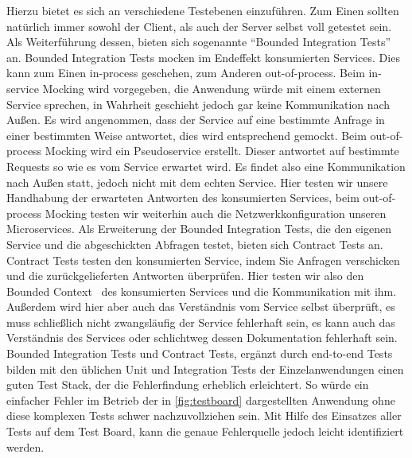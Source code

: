 Hierzu bietet es sich an verschiedene Testebenen einzuführen. Zum Einen sollten natürlich immer sowohl der Client, als auch der Server selbst voll getestet sein. Als Weiterführung dessen, bieten sich sogenannte ``Bounded Integration Tests''\cite[vgl.][]{rails:soa} an. Bounded Integration Tests mocken im Endeffekt konsumierten Services. Dies kann zum Einen in-process geschehen, zum Anderen out-of-process. Beim in-service Mocking wird vorgegeben, die Anwendung würde mit einem externen Service sprechen, in Wahrheit geschieht jedoch gar keine Kommunikation nach Außen. Es wird angenommen, dass der Service auf eine bestimmte Anfrage in einer bestimmten Weise antwortet, dies wird entsprechend gemockt. Beim out-of-process Mocking wird ein Pseudoservice erstellt. Dieser antwortet auf bestimmte Requests so wie es vom Service erwartet wird. Es findet also eine Kommunikation nach Außen statt, jedoch nicht mit dem echten Service. Hier testen wir unsere Handhabung der erwarteten Antworten des konsumierten Services, beim out-of-process Mocking testen wir weiterhin auch die Netzwerkkonfiguration unseren Microservices.\cite{fowler:mstesting}
Als Erweiterung der Bounded Integration Tests, die den eigenen Service und die abgeschickten Abfragen testet, bieten sich Contract Tests an.~\cite[vgl.][]{fowler:contracts} Contract Tests testen den konsumierten Service, indem Sie Anfragen verschicken und die zurückgelieferten Antworten überprüfen. Hier testen wir also den Bounded Context~\cite[vgl.][]{fowler:bounded} des konsumierten Services und die Kommunikation mit ihm. Außerdem wird hier aber auch das Verständnis vom Service selbst überprüft, es muss schließlich nicht zwangsläufig der Service fehlerhaft sein, es kann auch das Verständnis des Services oder schlichtweg dessen Dokumentation fehlerhaft sein.
Bounded Integration Tests und Contract Tests, ergänzt durch end-to-end Tests bilden mit den üblichen Unit und Integration Tests der Einzelanwendungen einen guten Test Stack, der die Fehlerfindung erheblich erleichtert. So würde ein einfacher Fehler im Betrieb der in \autoref{fig:testboard} dargestellten Anwendung ohne diese komplexen Tests schwer nachzuvollziehen sein. Mit Hilfe des Einsatzes aller Tests auf dem Test Board, kann die genaue Fehlerquelle jedoch leicht identifiziert werden.

